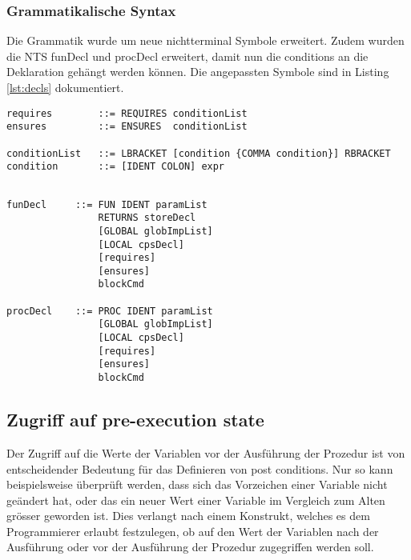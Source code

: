 \subsubsection{Grammatikalische Syntax}
Die Grammatik wurde um neue nichtterminal Symbole erweitert. Zudem wurden die NTS funDecl und 
procDecl erweitert, damit nun die conditions an die Deklaration gehängt werden können. Die angepassten
Symbole sind in Listing \ref{lst:decls} dokumentiert.
\newline
\begin{lstlisting}[caption=Neue nichtterminal Symbole]
requires        ::= REQUIRES conditionList
ensures         ::= ENSURES  conditionList

conditionList   ::= LBRACKET [condition {COMMA condition}] RBRACKET
condition       ::= [IDENT COLON] expr

\end{lstlisting}

\begin{lstlisting}[caption=Angepasste nichtterminal Symbole,label=lst:decls]

funDecl     ::= FUN IDENT paramList
                RETURNS storeDecl
                [GLOBAL globImpList]
                [LOCAL cpsDecl] 
                [requires]
                [ensures]
                blockCmd

procDecl    ::= PROC IDENT paramList
                [GLOBAL globImpList]
                [LOCAL cpsDecl]
                [requires]
                [ensures]
                blockCmd

\end{lstlisting}


\subsection{Zugriff auf pre-execution state}

Der Zugriff auf die Werte der Variablen vor der Ausführung der Prozedur ist 
von entscheidender Bedeutung für das Definieren von post conditions. Nur so 
kann beispielsweise überprüft werden, dass sich das Vorzeichen einer Variable
nicht geändert hat, oder das ein neuer Wert einer Variable im Vergleich zum 
Alten grösser geworden ist. Dies verlangt nach einem Konstrukt, welches 
es dem Programmierer erlaubt festzulegen, ob auf den Wert der Variablen
nach der Ausführung oder vor der Ausführung der Prozedur zugegriffen werden soll.

